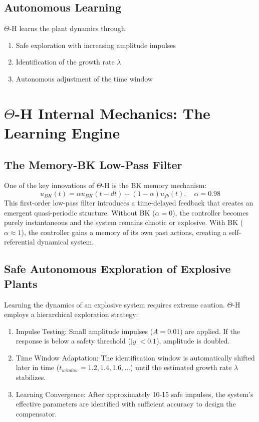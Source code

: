 \documentclass[twocolumn]{article}
\begin{document}
\subsection{Autonomous Learning}

$\Theta$-H learns the plant dynamics through:

\begin{enumerate}
    \item Safe exploration with increasing amplitude impulses
    \item Identification of the growth rate $\lambda$
    \item Autonomous adjustment of the time window
\end{enumerate}

\section{$\Theta$-H Internal Mechanics: The Learning Engine}
\label{sec:mechanics}

\subsection{The Memory-BK Low-Pass Filter}

One of the key innovations of $\Theta$-H is the BK memory mechanism:
{\small
\begin{equation}
u_{BK}(t) = \alpha u_{BK}(t-dt) + (1-\alpha) u_{fb}(t), \quad \alpha = 0.98
\label{eq:bk_filter}
\end{equation}
}
This first-order low-pass filter introduces a time-delayed feedback 
that creates an emergent quasi-periodic structure. Without BK ($\alpha=0$), 
the controller becomes purely instantaneous and the system remains chaotic 
or explosive. With BK ($\alpha \approx 1$), the controller gains a 
memory of its own past actions, creating a self-referential 
dynamical system.

\subsection{Safe Autonomous Exploration of Explosive Plants}

Learning the dynamics of an explosive system requires extreme caution. 
$\Theta$-H employs a hierarchical exploration strategy:

\begin{enumerate}
    \item Impulse Testing: Small amplitude impulses ($A = 0.01$) 
    are applied. If the response is below a safety threshold ($|y| < 0.1$),
    amplitude is doubled.
    
    \item Time Window Adaptation: The identification window is 
    automatically shifted later in time ($t_{window} = 1.2, 1.4, 1.6, ...$) 
    until the estimated growth rate $\lambda$ stabilizes.
    
    \item Learning Convergence: After approximately 10-15 safe 
    impulses, the system's effective parameters are identified with 
    sufficient accuracy to design the compensator.
\end{enumerate}
\end{document}
